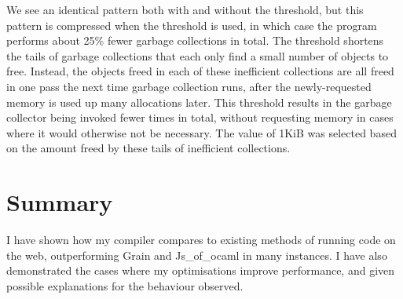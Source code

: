 We see an identical pattern both with and without the threshold, but this pattern is compressed when the threshold is used, in which case the program performs about 25\% fewer garbage collections in total.  The threshold shortens the tails of garbage collections that each only find a small number of objects to free. Instead, the objects freed in each of these inefficient collections are all freed in one pass the next time garbage collection runs, after the newly-requested memory is used up many allocations later. This threshold results in the garbage collector being invoked fewer times in total, without requesting memory in cases where it would otherwise not be necessary. The value of 1KiB was selected based on the amount freed by these tails of inefficient collections.

\section{Summary}
I have shown how my compiler compares to existing methods of running code on the web, outperforming Grain and Js\_of\_ocaml in many instances. I have also demonstrated the cases where my optimisations improve performance, and given possible explanations for the behaviour observed.












